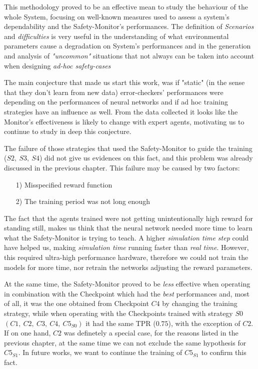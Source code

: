 This methodology proved to be an effective mean to study the behaviour of the whole System, focusing on well-known measures used to assess a system's dependability and the Safety-Monitor's performances. The definition of \textsl{Scenarios} and \textsl{difficulties} is very useful in the understanding of what environmental parameters cause a degradation on System's performances and in the generation and analysis of \textsl{"uncommon"} situations that not always can be taken into account when designing \textsl{ad-hoc safety-cases}
\newline

The main conjecture that made us start this work, was if "static" (in the sense that they don't learn from new data) error-checkers' performances were depending on the performances of neural networks and if ad hoc training strategies have an influence as well. From the data collected it looks like the Monitor's effectiveness is likely to change with expert agents, motivating us to continue to study in deep this conjecture.

The failure of those strategies that used the Safety-Monitor to guide the training ($S2,\: S3,\: S4$) did not give us evidences on this fact, and this problem was already discussed in the previous chapter. This failure may be caused by two factors:

\begin{itemize}
	\item[1)] Misspecified reward function
	\item[2)] The training period was not long enough
\end{itemize}

The fact that the agents trained were not getting unintentionally high reward for standing still, makes us think that the neural network needed more time to learn what the Safety-Monitor is trying to teach. A higher \textsl{simulation time step} could have helped us, making \textsl{simulation time} running faster than \textsl{real time}. However, this required ultra-high performance hardware, therefore we could not train the models for more time, nor retrain the networks adjusting the reward parameters.

At the same time, the Safety-Monitor proved to be \textsl{less} effective when operating in combination with the Checkpoint which had the \textsl{best} performances and, most of all, it was the one obtained from Checkpoint $C4$ by changing the training strategy, while when operating with the Checkpoints trained with strategy $S0$ $(C1,\: C2,\: C3,\: C4,\: C5_{S0})$ it had the same TPR ($0.75$), with the exception of $C2$. If on one hand, $C2$ was definetely a special case, for the reasons listed in the previous chapter, at the same time we can not exclude the same hypothesis for $C5_{S1}$. In future works, we want to continue the training of $C5_{S1}$ to confirm this fact.\newline

